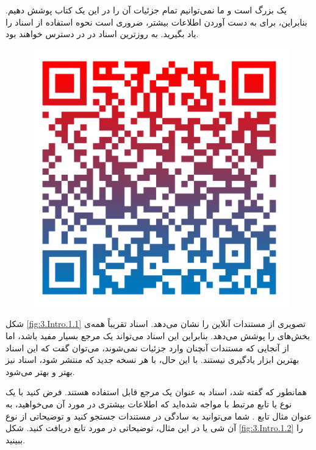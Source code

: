 {
    \Large
     یک  بزرگ است و ما نمی‌توانیم تمام جزئیات آن را در این یک کتاب پوشش دهیم.
    بنابراین، برای به دست آوردن اطلاعات بیشتر، ضروری است نحوه استفاده از اسناد  را یاد بگیرید.
    به روزترین اسناد در  در دسترس خواهند بود.

    \begin{figure}[H]
        \centering
        \setlength{\belowcaptionskip}{-10pt}
        \includegraphics[scale=0.15]{Images/3/3.Intro.0.2}
        \caption*{\Large \href{https://learn.microsoft.com/en-us/windows/win32/direct3d12/directx-12-programming-guide}{}}
    \end{figure}

    شکل \ref{fig:3.Intro.1.1} تصویری از مستندات آنلاین را نشان می‌دهد.
    اسناد  تقریباً همه‌ی بخش‌های  را پوشش می‌دهد.
    بنابراین این اسناد می‌تواند یک مرجع بسیار مفید باشد، اما از آنجایی که مستندات آنچنان وارد جزئیات نمی‌شوند، می‌توان گفت که این اسناد بهترین ابزار یادگیری نیستند. با این حال، با هر نسخه جدید  که منتشر شود، اسناد نیز بهتر و بهتر می‌شود.

    همانطور که گفته شد، اسناد به عنوان یک مرجع قابل استفاده هستند.
    فرض کنید با یک نوع یا تابع مرتبط با  مواجه شده‌اید که اطلاعات بیشتری در مورد آن می‌خواهید، به عنوان مثال تابع .
    شما می‌توانید به سادگی در مستندات جستجو کنید و توضیحاتی از نوع آن شی یا در این مثال، توضیحاتی در مورد تابع دریافت کنید. شکل \ref{fig:3.Intro.1.2} را ببینید.

}
